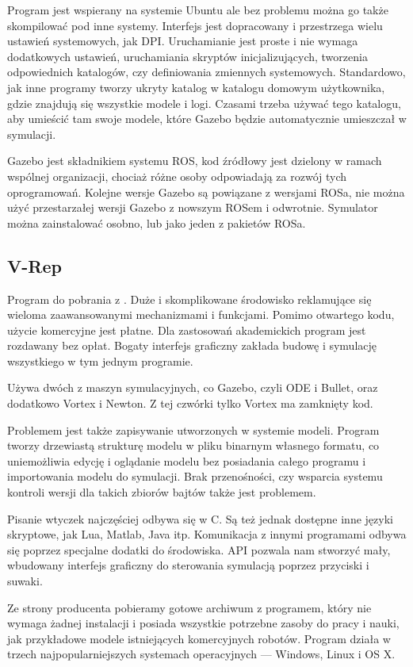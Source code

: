Program jest wspierany na systemie Ubuntu ale bez problemu można go także skompilować pod inne systemy.
Interfejs jest dopracowany i przestrzega wielu ustawień systemowych, jak DPI.
Uruchamianie jest proste i nie wymaga dodatkowych ustawień, uruchamiania skryptów inicjalizujących, tworzenia odpowiednich katalogów, czy definiowania zmiennych systemowych.
Standardowo, jak inne programy tworzy ukryty katalog w katalogu domowym użytkownika, gdzie znajdują się wszystkie modele i logi.
Czasami trzeba używać tego katalogu, aby umieścić tam swoje modele, które Gazebo będzie automatycznie umieszczał w symulacji.

Gazebo jest składnikiem systemu ROS, kod źródłowy jest dzielony w ramach wspólnej organizacji, chociaż różne osoby odpowiadają za rozwój tych oprogramowań.
Kolejne wersje Gazebo są powiązane z wersjami ROSa, nie można użyć przestarzałej wersji Gazebo z nowszym ROSem i odwrotnie.
Symulator można zainstalować osobno, lub jako jeden z pakietów ROSa.

\subsection{V-Rep}
Program do pobrania z \cite{vrep_website}. Duże i skomplikowane środowisko reklamujące się wieloma zaawansowanymi mechanizmami i funkcjami.
Pomimo otwartego kodu, użycie komercyjne jest płatne. Dla zastosowań akademickich program jest rozdawany bez opłat.
Bogaty interfejs graficzny zakłada budowę i symulację wszystkiego w tym jednym programie.

Używa dwóch z maszyn symulacyjnych, co Gazebo, czyli ODE i Bullet, oraz dodatkowo Vortex i Newton. Z tej czwórki tylko Vortex ma zamknięty kod.

Problemem jest także zapisywanie utworzonych w systemie modeli.
Program tworzy drzewiastą strukturę modelu w pliku binarnym własnego formatu, co uniemożliwia edycję i oglądanie modelu bez posiadania całego programu i importowania modelu do symulacji.
Brak przenośności, czy wsparcia systemu kontroli wersji dla takich zbiorów bajtów także jest problemem.

Pisanie wtyczek najczęściej odbywa się w C. Są też jednak dostępne inne języki skryptowe, jak Lua, Matlab, Java itp.
Komunikacja z innymi programami odbywa się poprzez specjalne dodatki do środowiska.
API pozwala nam stworzyć mały, wbudowany interfejs graficzny do sterowania symulacją poprzez przyciski i suwaki.

Ze strony producenta pobieramy gotowe archiwum z programem, który nie wymaga żadnej instalacji i posiada wszystkie potrzebne zasoby do pracy i nauki, jak przykładowe modele istniejących komercyjnych robotów.
Program działa w trzech najpopularniejszych systemach operacyjnych --- Windows, Linux i OS X.


